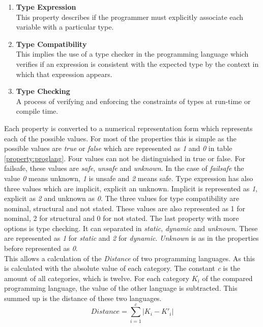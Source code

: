 \begin{enumerate}
	\item \textbf{Type Expression}\\ This property describes if the programmer must explicitly associate each variable with a particular type.
	\item \textbf{Type Compatibility}\\ This implies the use of a type checker in the programming language which verifies if an expression is consistent with the expected type by the context in which that expression appears.
	\item \textbf{Type Checking}\\ A process of verifying and enforcing the constraints of types at run-time or compile time.\\
\end{enumerate}
Each property is converted to a numerical representation form which represents each of the possible values. For most of the properties this is simple as the possible values are \textit{true} or \textit{false} which are represented as \textit{1} and \textit{0} in table \ref{property:proglang}. Four values can not be distinguished in true or false. For failsafe, these values are \textit{safe}, \textit{unsafe} and \textit{unknown}. In the case of \textit{failsafe} the value \textit{0} means unknown, \textit{1} is unsafe and \textit{2} means safe. Type expression has also three values which are implicit, explicit an unknown. Implicit is represented as \textit{1}, explicit as \textit{2} and unknown as \textit{0}. The three values for type compatibility are nominal, structural and not stated. These values are also represented as 1 for nominal, 2 for structural and 0 for not stated. The last property with more options is type checking. It can separated in \textit{static}, \textit{dynamic} and \textit{unknown}. These are represented as \textit{1} for \textit{static} and \textit{2} for \textit{dynamic}. \textit{Unknown} is as in the properties before represented as \textit{0}.\\
This allows a calculation of the \textit{Distance} of two programming languages. As this is calculated with the absolute value of each category. The constant \textit{c} is the amount of all categories, which is twelve. For each category \textit{$K_i$} of the compared programming language, the value of the other language is subtracted. This summed up is the distance of these two languages.
\begin{equation}
\textit{Distance} = \sum \limits_{i=1}^c \lvert K_i - K'_i\rvert \label{pl:distanceequation}
\end{equation}
